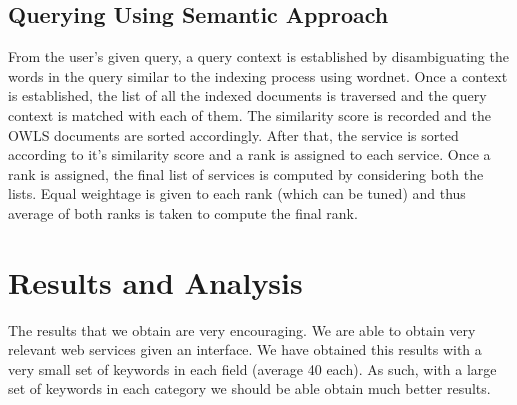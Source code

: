 \documentclass[12pt, oneside]{book}
\begin{document}
\subsection{Querying Using Semantic Approach}
From the user's given query, a query context is established by disambiguating the words in the query similar to the indexing process using wordnet. Once a context is established, the list of all the indexed documents is traversed and the query context is matched with each of them. The similarity score is recorded and the OWLS documents are sorted accordingly. After that, the service is sorted according to it's similarity score and a rank is assigned to each service. Once a rank is assigned, the final list of services is computed by considering both the lists. Equal weightage is given to each rank (which can be tuned) and thus average of both ranks is taken to compute the final rank.

\section{Results and Analysis}
The results that we obtain are very encouraging. We are able to obtain very relevant web services given an interface. We have obtained this results with a very small set of keywords in each field (average 40 each). As such, with a large set of keywords in each category we should be able obtain much better results.
\end{document}
